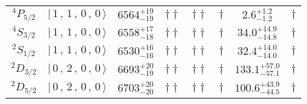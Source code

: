 \begin{tabular}{c| c c c c c c c}
$^{4}P_{5/2}$ & $\vert \,1\,,\,1\,,\,0\,,\,0 \,\rangle $ & $6564^{+19}_{-19}$ & $\dagger\dagger$ & $\dagger\dagger$ & $\dagger$ & $2.6^{+1.2}_{-1.2}$ & $\dagger$ \\ 
$^{4}S_{3/2}$ & $\vert \,1\,,\,1\,,\,0\,,\,0 \,\rangle $ & $6558^{+17}_{-18}$ & $\dagger\dagger$ & $\dagger\dagger$ & $\dagger$ & $34.0^{+14.9}_{-14.8}$ & $\dagger$ \\ 
$^{2}S_{1/2}$ & $\vert \,1\,,\,1\,,\,0\,,\,0 \,\rangle $ & $6530^{+16}_{-16}$ & $\dagger\dagger$ & $\dagger\dagger$ & $\dagger$ & $32.4^{+14.0}_{-14.0}$ & $\dagger$ \\ 
$^{2}D_{3/2}$ & $\vert \,0\,,\,2\,,\,0\,,\,0 \,\rangle $ & $6693^{+20}_{-19}$ & $\dagger\dagger$ & $\dagger\dagger$ & $\dagger$ & $133.1^{+57.0}_{-57.1}$ & $\dagger$ \\ 
$^{2}D_{5/2}$ & $\vert \,0\,,\,2\,,\,0\,,\,0 \,\rangle $ & $6703^{+20}_{-20}$ & $\dagger\dagger$ & $\dagger\dagger$ & $\dagger$ & $100.6^{+43.9}_{-44.5}$ & $\dagger$ \\ 
\hline \hline
\end{tabular}
